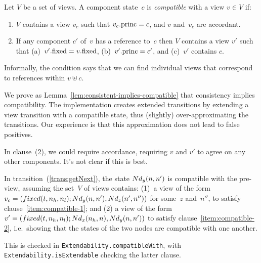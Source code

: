 \begin{definition}
\label{def:compatible}
Let $V$ be a set of views.  A component state~$c$ is \emph{compatible} with a
view $v \in V$ if:
%
\begin{enumerate}
\item\label{item:compatible-1} $V$ contains a view $v_c$ such that $v_c.\mathrm{princ}
  = c$, and $v$ and~$v_c$ are accordant.


\item\label{item:compatible-2} If any component $c'$ of~$v$ has a reference
  to~$c$ then $V$ contains a view $v'$ such that (a)~$v'.\mathrm{fixed} = v.\mathrm{fixed}$,
  (b)~$v'.\mathrm{princ} = c'$, and (c)~$v'$ contains $c$.
\end{enumerate}
\end{definition}
%
Informally, the condition says that we can find individual views that
correspond to references within $v \uplus c$. 

We prove as
Lemma~\ref{lem:consistent-implies-compatible} that consistency implies
compatibility.  The implementation creates extended transitions by extending a
view transition with a compatible state, thus (slightly) over-approximating
the transitions.  Our experience is that this approximation
does not lead to false positives.

\begin{improve}
In clause~(2), we could require accordance, requiring $v$ and $v'$ to agree on
any other components.  It's not clear if this is best. 
\end{improve}

In transition~(\ref{trans:getNext}), the state $Nd_y(n, n')$ is compatible
with the pre-view, assuming the set~$V$ of views contains: (1)~a view of the
form $v_c = (fixed(t, n_h, n_l);\linebreak[1] \Node_y(n, n'), \linebreak[1]
\Node_z(n', n''))$ for some~$z$ and~$n''$, to satisfy
clause~\ref{item:compatible-1}; and (2) a view of the form $v' = (fixed(t,
n_h, n_l); \Node_x(n_h, n), \linebreak[1] \Node_y(n, n'))$ to satisfy
clause~\ref{item:compatible-2}, i.e.~showing that the states of the two nodes
are compatible with one another.

\begin{impNote}
This is checked in
  \texttt{Extendability.\linebreak[1]compatible\-With}, with
  \texttt{Extendability.isExtendable} checking the latter clause.
\end{impNote}


